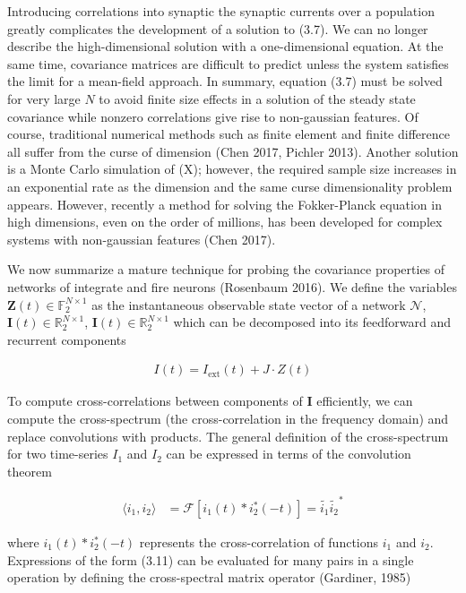 \documentclass{ucetd}
\begin{document}
Introducing correlations into synaptic the synaptic currents over a population greatly complicates the development of a solution to (3.7). We can no longer describe the high-dimensional solution with a one-dimensional equation. At the same time, covariance matrices are difficult to predict unless the system satisfies the limit for a mean-field approach. In summary, equation (3.7) must be solved for very large $N$ to avoid finite size effects in a solution of the steady state covariance while nonzero correlations give rise to non-gaussian features.  Of course, traditional numerical methods such as finite element and finite difference all suffer from the curse of dimension (Chen 2017, Pichler 2013). Another solution is a Monte Carlo simulation of (X); however, the required sample size increases in an exponential rate as the dimension and the same curse dimensionality problem appears. However, recently a method for solving the Fokker-Planck equation in high dimensions, even on the order of millions, has been developed for complex systems with non-gaussian features (Chen 2017). 

We now summarize a mature technique for probing the covariance properties of networks of integrate and fire neurons (Rosenbaum 2016). We define the variables $\mathbf{Z}(t)\in \mathbb{F}_{2}^{N\times 1}$ as the instantaneous observable state vector of a network $\mathcal{N}$, $\mathbf{I}(t)\in \mathbb{R}_{2}^{N\times 1}$, $\mathbf{I}(t)\in \mathbb{R}_{2}^{N\times 1}$ which can be decomposed into its feedforward and recurrent components

\begin{align}
I(t) = I_{\mathrm{ext}}(t) + J\cdot Z(t)
\end{align}

To compute cross-correlations between components of $\mathbf{I}$ efficiently, we can compute the cross-spectrum (the cross-correlation in the frequency domain) and replace convolutions with products. The general definition of the cross-spectrum for two time-series $I_{1}$ and $I_{2}$ can be expressed in terms of the convolution theorem

\begin{align}
\langle i_{1}, i_{2}\rangle &= \mathcal{F}\left[i_{1}(t)*i_{2}^{*}(-t)\right] = \tilde{i_{1}}\tilde{i_{2}}^{*}
\end{align}

where $i_{1}(t)*i_{2}^{*}(-t)$ represents the cross-correlation of functions $i_{1}$ and $i_{2}$. Expressions of the form (3.11) can be evaluated for many pairs in a single operation by defining the cross-spectral matrix operator (Gardiner, 1985)
\end{document}
